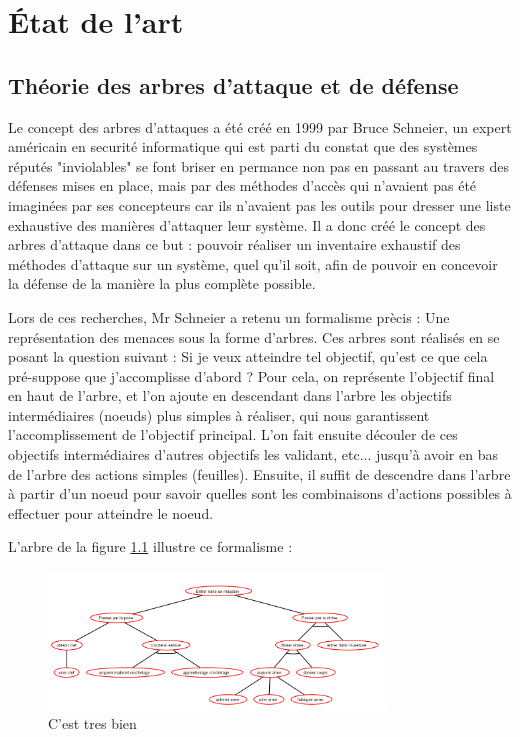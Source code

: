 \chapter{\'Etat de l'art}
	\section{Théorie des arbres d'attaque et de défense}
		Le concept des arbres d'attaques a été créé en 1999 par Bruce Schneier, un expert américain en securité informatique qui est parti du constat que des systèmes réputés "inviolables" se font briser en permance non pas en passant au travers des défenses mises en place, mais par des méthodes d'accès qui n'avaient pas été imaginées par ses concepteurs car ils n'avaient pas les outils pour dresser une liste exhaustive des manières d'attaquer leur système. Il a donc créé le concept des arbres d'attaque dans ce but : pouvoir réaliser un inventaire exhaustif des méthodes d'attaque sur un système, quel qu'il soit, afin de pouvoir en concevoir la défense de la manière la plus complète possible.

		Lors de ces recherches, Mr Schneier a retenu un formalisme prècis : Une représentation des menaces sous la forme d'arbres. Ces arbres sont réalisés en se posant la question suivant : Si je veux atteindre tel objectif, qu'est ce que cela pré-suppose que j'accomplisse d'abord ? Pour cela, on représente l'objectif final en haut de l'arbre, et l'on ajoute en descendant dans l'arbre les objectifs intermédiaires (noeuds) plus simples à réaliser, qui nous garantissent l'accomplissement de l'objectif principal. L'on fait ensuite découler de ces objectifs intermédiaires d'autres objectifs les validant, etc... jusqu'à avoir en bas de l'arbre des actions simples (feuilles). Ensuite, il suffit de descendre dans l'arbre à partir d'un noeud pour savoir quelles sont les combinaisons d'actions possibles à effectuer pour atteindre le noeud. 

		L'arbre de la figure \ref{fig:arbre_exemple_1} illustre ce formalisme : 

		\begin{figure}
			\begin{center}
				\includegraphics[width=0.8\textwidth]{figure/Entrer_dans_un_magasin.png}
			\end{center}
			\caption{C'est tres bien}
			\label{fig:arbre_exemple_1}
		\end{figure}

